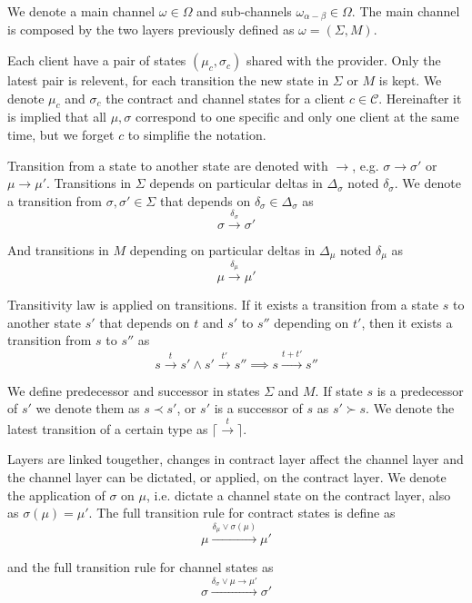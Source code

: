 \documentclass{llncs}
\begin{document}
We denote a main channel $\omega \in \Omega$ and sub-channels $\omega_{\alpha - \beta} \in \Omega$. The main channel is composed by the two layers previously defined as $\omega = (\Sigma, M)$.

Each client have a pair of states $(\mu_c, \sigma_c)$ shared with the provider. Only the latest pair is relevent, for each transition the new state in $\Sigma$ or $M$ is kept. We denote $\mu_c$ and $\sigma_c$ the contract and channel states for a client $c \in \mathcal{C}$. Hereinafter it is implied that all $\mu, \sigma$ correspond to one specific and only one client at the same time, but we forget $c$ to simplifie the notation.

Transition from a state to another state are denoted with $\rightarrow$, e.g. $\sigma \rightarrow \sigma'$ or $\mu \rightarrow \mu'$. Transitions in $\Sigma$ depends on particular deltas in $\Delta_\sigma$ noted $\delta_\sigma$. We denote a transition from $\sigma, \sigma' \in \Sigma$ that depends on $\delta_\sigma \in \Delta_\sigma$ as
$$\sigma \xrightarrow{\delta_\sigma} \sigma'$$

And transitions in $M$ depending on particular deltas in $\Delta_\mu$ noted $\delta_\mu$ as
$$\mu \xrightarrow{\delta_\mu} \mu'$$

Transitivity law is applied on transitions. If it exists a transition from a state $s$ to another state $s'$ that depends on $t$ and $s'$ to $s''$ depending on $t'$, then it exists a transition from $s$ to $s''$ as
$$s \xrightarrow{t} s' \land s' \xrightarrow{t'} s'' \implies s \xrightarrow{t + t'} s''$$

We define predecessor and successor in states $\Sigma$ and $M$. If state $s$ is a predecessor of $s'$ we denote them as $s \prec s'$, or $s'$ is a successor of $s$ as $s' \succ s$. We denote the latest transition of a certain type as $\lceil \xrightarrow{t} \rceil$.

Layers are linked tougether, changes in contract layer affect the channel layer and the channel layer can be dictated, or applied, on the contract layer. We denote the application of $\sigma$ on $\mu$, i.e. dictate a channel state on the contract layer, also as $\sigma(\mu) = \mu'$. The full transition rule for contract states is define as
$$\mu \xrightarrow{\delta_\mu \lor \sigma(\mu)} \mu'$$

and the full transition rule for channel states as
$$\sigma \xrightarrow{\delta_\sigma \lor \mu \rightarrow \mu'} \sigma'$$
\end{document}
